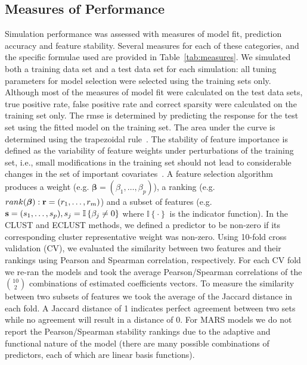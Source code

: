 \subsection{Measures of Performance}
Simulation performance was assessed with measures of model fit, prediction accuracy and feature stability. Several measures for each of these categories, and the specific formulae used are provided in Table~\ref{tab:measures}. We simulated both a training data set and a test data set for each simulation: all tuning parameters for  model selection were selected using the training sets only.  Although most of the measures of model fit were calculated on the test data sets, true positive rate, false positive rate and correct sparsity were calculated on the training set only. The \ac{rmse} is determined by predicting the response for the test set using the fitted model on the training set. The area under the curve is determined using the trapezoidal rule~\citep{auc}. The stability of feature importance is defined as the variability of feature weights under perturbations of the training set, i.e., small modifications in the training set should not lead to considerable changes in the set of important covariates~\citep{tolocsi2011classification}. A feature selection algorithm produces a weight (e.g. $\boldsymbol{\beta}= (\beta_1, \ldots, \beta_p)$), a ranking (e.g. $rank(\boldsymbol{\beta}):\mathbf{r} = (r_1, \ldots, r_m)$) and a subset of features (e.g. $\mathbf{s}=(s_1,\ldots, s_p), s_j = \mathbb{I}\left\lbrace\beta_j\neq 0 \right\rbrace$ where $\mathbb{I}\left\lbrace \cdot\right\rbrace$ is the indicator function). 
In the CLUST and ECLUST methods, we defined a predictor to be non-zero if its corresponding cluster representative weight was non-zero. Using 10-fold cross validation (CV), we evaluated the similarity between two features and their rankings using Pearson and Spearman correlation, respectively. For each CV fold we re-ran the models and took the average Pearson/Spearman correlations of the $\binom{10}{2}$ combinations of estimated coefficients vectors. To measure the similarity between two subsets of features we took the average of the Jaccard distance in each fold. A Jaccard distance of 1 indicates perfect agreement between two sets while no agreement will result in a distance of 0. For MARS models we do not report the Pearson/Spearman stability rankings due to the adaptive and functional nature of the model (there are many possible combinations of predictors, each of which are linear basis functions). 


